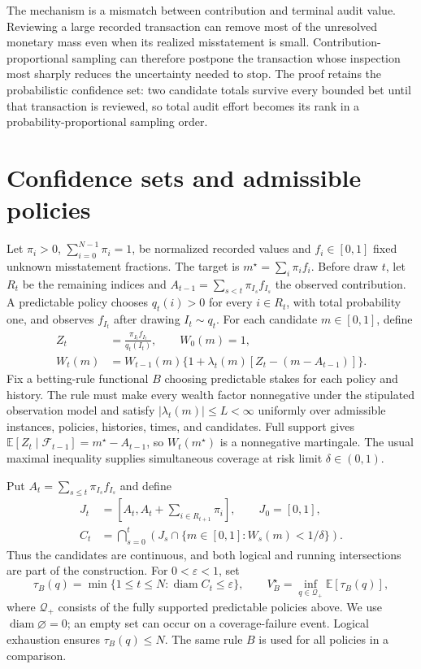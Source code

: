 \documentclass[11pt]{article}
\newcommand{\E}{\mathbb{E}}
\newcommand{\diam}{\operatorname{diam}}
\begin{document}
The mechanism is a mismatch between contribution and terminal audit value.
Reviewing a large recorded transaction can remove most of the unresolved
monetary mass even when its realized misstatement is small.
Contribution-proportional sampling can therefore postpone the transaction
whose inspection most sharply reduces the uncertainty needed to stop. The
proof retains the probabilistic confidence set: two candidate totals survive
every bounded bet until that transaction is reviewed, so total audit effort
becomes its rank in a probability-proportional sampling order.

\section{Confidence sets and admissible policies}
Let $\pi_i>0$, $\sum_{i=0}^{N-1}\pi_i=1$, be normalized recorded values and
$f_i\in[0,1]$ fixed unknown misstatement fractions. The target is
$m^\star=\sum_i\pi_i f_i$. Before draw $t$, let $R_t$ be the remaining
indices and $A_{t-1}=\sum_{s<t}\pi_{I_s}f_{I_s}$ the observed contribution.
A predictable policy chooses $q_t(i)>0$ for every $i\in R_t$, with total
probability one, and observes $f_{I_t}$ after drawing $I_t\sim q_t$.
For each candidate $m\in[0,1]$, define
\begin{equation}\label{eq:wealth}
\begin{split}
 Z_t&=\frac{\pi_{I_t}f_{I_t}}{q_t(I_t)},\qquad W_0(m)=1,\\
 W_t(m)&=W_{t-1}(m)\{1+\lambda_t(m)[Z_t-(m-A_{t-1})]\}.
\end{split}
\end{equation}
Fix a betting-rule functional $B$ choosing predictable stakes for each policy
and history. The rule must make every wealth factor nonnegative under the
stipulated observation model and satisfy $|\lambda_t(m)|\le L<\infty$
uniformly over admissible instances, policies, histories, times, and candidates.
Full support gives $\E[Z_t\mid\mathcal F_{t-1}]=m^\star-A_{t-1}$, so
$W_t(m^\star)$ is a nonnegative martingale. The usual maximal inequality
supplies simultaneous coverage at risk limit $\delta\in(0,1)$.

Put $A_t=\sum_{s\le t}\pi_{I_s}f_{I_s}$ and define
\begin{equation}\label{eq:confidence}
\begin{split}
 J_t&=\left[A_t,A_t+\sum_{i\in R_{t+1}}\pi_i\right],\qquad J_0=[0,1],\\
 C_t&=\bigcap_{s=0}^{t}\left(J_s\cap\{m\in[0,1]:W_s(m)<1/\delta\}\right).
\end{split}
\end{equation}
Thus the candidates are continuous, and both logical and running
intersections are part of the construction. For $0<\varepsilon<1$, set
\begin{equation}\label{eq:value}
 \tau_B(q)=\min\{1\le t\le N:\diam C_t\le\varepsilon\},\qquad
 V_B^\star=\inf_{q\in\mathcal Q_+}\E[\tau_B(q)],
\end{equation}
where $\mathcal Q_+$ consists of the fully supported predictable policies
above. We use $\diam\varnothing=0$; an empty set can occur on a coverage-failure
event. Logical exhaustion ensures $\tau_B(q)\le N$. The same rule $B$ is
used for all policies in a comparison.
\end{document}
